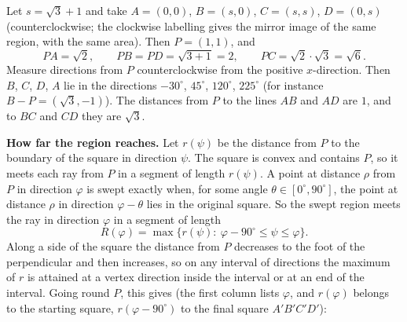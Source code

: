 Let $s=\sqrt3+1$ and take $A=(0,0)$, $B=(s,0)$, $C=(s,s)$, $D=(0,s)$ (counterclockwise; the clockwise labelling gives the mirror image of the same region, with the same area). Then $P=(1,1)$, and
\[PA=\sqrt2,\qquad PB=PD=\sqrt{3+1}=2,\qquad PC=\sqrt2\cdot\sqrt3=\sqrt6.\]
Measure directions from $P$ counterclockwise from the positive $x$-direction. Then $B$, $C$, $D$, $A$ lie in the directions $-30^\circ$, $45^\circ$, $120^\circ$, $225^\circ$ (for instance $B-P=\left(\sqrt3,-1\right)$). The distances from $P$ to the lines $AB$ and $AD$ are $1$, and to $BC$ and $CD$ they are $\sqrt3$.

\textbf{How far the region reaches.} Let $r(\psi)$ be the distance from $P$ to the boundary of the square in direction $\psi$. The square is convex and contains $P$, so it meets each ray from $P$ in a segment of length $r(\psi)$. A point at distance $\rho$ from $P$ in direction $\varphi$ is swept exactly when, for some angle $\theta\in[0^\circ,90^\circ]$, the point at distance $\rho$ in direction $\varphi-\theta$ lies in the original square. So the swept region meets the ray in direction $\varphi$ in a segment of length
\[R(\varphi)=\max\{r(\psi):\ \varphi-90^\circ\le\psi\le\varphi\}.\]
Along a side of the square the distance from $P$ decreases to the foot of the perpendicular and then increases, so on any interval of directions the maximum of $r$ is attained at a vertex direction inside the interval or at an end of the interval. Going round $P$, this gives (the first column lists $\varphi$, and $r(\varphi)$ belongs to the starting square, $r(\varphi-90^\circ)$ to the final square $A'B'C'D'$):
